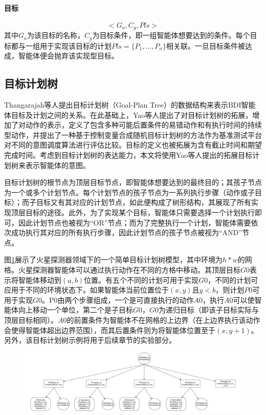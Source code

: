 \paragraph{目标}
$$<G_a,C_g,Pls>$$
其中$G_a$为该目标的名称，$C_g$为目标条件，即一组智能体想要达到的条件。每个目标都与一组用于实现该目标的计划$Pls=\{P_1,\dots,P_n\}$相关联。一旦目标条件被达成，智能体便会抛弃该实现型目标。

\subsection{目标计划树}
Thangarajah等人\cite{DBLP:journals/jar/ThangarajahP11,DBLP:conf/ijcai/ThangarajahPW03,DBLP:conf/ijcai/ThangarajahPW03,DBLP:conf/ecai/ThangarajahWPF02}提出目标计划树（Goal-Plan Tree）的数据结构来表示BDI智能体目标及计划之间的关系。在此基础上，Yao等人\cite{DBLP:conf/atal/YaoSL16}提出了对目标计划树的拓展，增加了对动作的表示，定义了包含多种可能后置条件的易错动作和有执行时间的持续型动作，并提出了一种基于控制变量合成随机目标计划树的方法\cite{patent0}作为基准测试平台对不同的意图调度算法进行评估比较。目标的定义也被拓展为含有截止时间和期望完成时间。考虑到目标计划树的表达能力，本文将使用Yao等人提出的拓展目标计划树来表示智能体的意图。

目标计划树的根节点为顶层目标节点，即智能体想要达到的最终目的；其孩子节点为一个或多个计划节点。每个计划节点的孩子节点为一系列执行步骤（动作或子目标）；而子目标又有其对应的计划节点，如此便构成了树形结构，其展现了所有实现顶层目标的途径。此外，为了实现某个目标，智能体只需要选择一个计划执行即可，因此计划节点也被视为“OR”节点；而为了完整执行一个计划，智能体需要依次成功执行其对应的所有执行步骤，因此计划节点的孩子节点被视为“AND”节点。

图\ref{fig:gpt}展示了火星探测器领域下的一个简单目标计划树模型，其中环境为$h*w$的网格。火星探测器智能体可以通过执行动作在不同的方格中移动。其顶层目标$G0$表示将智能体移动到$(a,b)$位置。有五个不同的计划可用于实现$G0$，不同的计划可应用于不同的环境状态下。如果智能体当前位置位于$(x,y)$且$y < b$，则计划$P0$可用于实现$G0$。P0由两个步骤组成，一个是可直接执行的动作$A0$，执行$A0$可以使智能体向上移动一个单位，第二个是子目标$G0$，$G0$为递归目标（即该子目标实际与顶层目标相同）。$A0$的前置条件为智能体不在网格的上边界（在上边界执行该动作会使得智能体超出边界范围），而其后置条件则为将智能体位置至于$(x,y+1)$。另外，该目标计划树示例将用于后续章节的实验部分。
\begin{figure}[htb]
\centering
\includegraphics[scale=0.23]{./figs/MarsRover_GPT}
\label{fig:gpt}
\end{figure}

